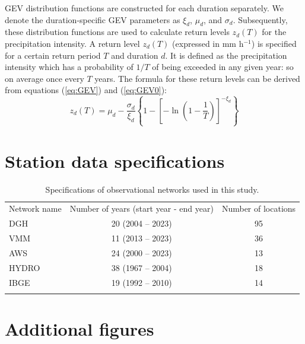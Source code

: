 \documentclass[journal abbreviation, manuscript]{copernicus}
\begin{document}
GEV distribution functions are constructed for each duration separately. We denote the duration-specific GEV parameters as $\xi_d$, $\mu_d$, and $\sigma_d$. Subsequently, these distribution functions are used to calculate return levels $z_d(T)$ for the precipitation intensity. A return level $z_d(T)$ (expressed in mm h$^{-1}$) is specified for a certain return period $T$ and duration $d$. It is defined as the precipitation intensity which has a probability of $1/T$ of being exceeded in any given year: so on average once every $T$ years. The formula for these return levels can be derived from equations (\ref{eq:GEV}) and (\ref{eq:GEV0}):
\begin{equation}
    z_d(T) = \mu_d - \frac{\sigma_d}{\xi_d} \left\{1 - \left[- \ln{\left(1 - \frac{1}{T} \right)} \right]^{-\xi_d} \right\}
\end{equation}

\newpage

\section{Station data specifications}

\begin{table}[h!]
\caption{Specifications of observational networks used in this study.}
\begin{tabular}{lcc}
\tophline
Network name & Number of years (start year - end year) & Number of locations \\
\middlehline
DGH & 20 (2004 -- 2023) & 95 \\
VMM & 11 (2013 -- 2023) & 36 \\
AWS & 24 (2000 -- 2023) & 13 \\
HYDRO & 38 (1967 -- 2004) & 18 \\
IBGE & 19 (1992 -- 2010) & 14 \\
\bottomhline
\end{tabular}
\belowtable{} \label{tab:stations}
\end{table}

\newpage

\section{Additional figures}    
\end{document}
